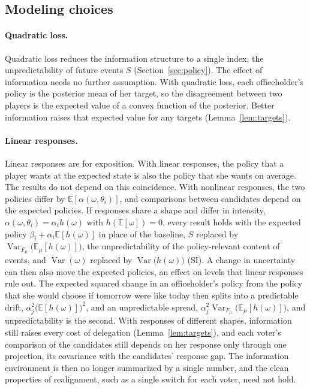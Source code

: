 \documentclass[12pt,letterpaper]{article}
\begin{document}
\subsection{Modeling choices}\label{sec:choices}

\paragraph{Quadratic loss.} Quadratic loss reduces the information structure to a single index, the unpredictability of future events $S$ (Section~\ref{sec:policy}). The effect of information needs no further assumption. With quadratic loss, each officeholder's policy is the posterior mean of her target, so the disagreement between two players is the expected value of a convex function of the posterior. Better information raises that expected value for any targets (Lemma~\ref{lem:targets}).

\paragraph{Linear responses.} Linear responses are for exposition. With linear responses, the policy that a player wants at the expected state is also the policy that she wants on average. The results do not depend on this coincidence. With nonlinear responses, the two policies differ by $\mathbb{E}[\alpha(\omega,\theta_i)]$, and comparisons between candidates depend on the expected policies. If responses share a shape and differ in intensity, $\alpha(\omega,\theta_i)=\alpha_i h(\omega)$ with $h(\mathbb{E}[\omega])=0$, every result holds with the expected policy $\beta_i+\alpha_i\mathbb{E}[h(\omega)]$ in place of the baseline, $S$ replaced by $\operatorname{Var}_{F_\mu}\big(\mathbb{E}_\mu[h(\omega)]\big)$, the unpredictability of the policy-relevant content of events, and $\operatorname{Var}(\omega)$ replaced by $\operatorname{Var}\big(h(\omega)\big)$ (SI). A change in uncertainty can then also move the expected policies, an effect on levels that linear responses rule out. The expected squared change in an officeholder's policy from the policy that she would choose if tomorrow were like today then splits into a predictable drift, $\alpha_j^2\big(\mathbb{E}[h(\omega)]\big)^2$, and an unpredictable spread, $\alpha_j^2\operatorname{Var}_{F_\mu}\big(\mathbb{E}_\mu[h(\omega)]\big)$, and unpredictability is the second. With responses of different shapes, information still raises every cost of delegation (Lemma~\ref{lem:targets}), and each voter's comparison of the candidates still depends on her response only through one projection, its covariance with the candidates' response gap. The information environment is then no longer summarized by a single number, and the clean properties of realignment, such as a single switch for each voter, need not hold.
\end{document}
